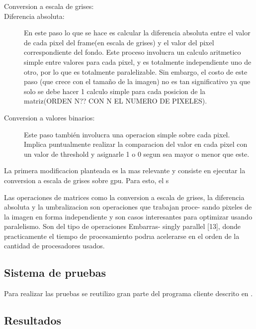 \documentclass[a4paper,10pt]{report}
\begin{document}
\begin{description}
 \item [Conversion a escala de grises: ]
 \item [Diferencia absoluta: ] En este paso lo que se hace es calcular la diferencia absoluta entre el valor de cada pixel del frame(en escala de grises) y el valor del pixel correspondiente del fondo. 
 Este proceso involucra un calculo aritmetico simple entre valores para cada pixel, y es totalmente independiente uno de otro, por lo que es totalmente paralelizable. 
 Sin embargo, el costo de este paso (que crece con el tamaño de la imagen) no es tan significativo ya que solo se debe hacer 1 calculo simple para cada posicion de la matriz(ORDEN N?? CON N EL NUMERO DE PIXELES).
 \item[Conversion a valores binarios:] Este paso también involucra una operacion simple sobre cada pixel. Implica puntualmente realizar la comparacion del valor en cada pixel con un valor de threshold y asignarle 1 o 0 segun sea mayor o menor que este.

 \end{description}
 
La primera modificacion planteada es la mas relevante y consiste en ejecutar la conversion a escala de grises sobre gpu. 
Para esto, el s 




Las operaciones de matrices como la conversion a escala de grises, la
diferencia absoluta y la umbralizacion son operaciones que trabajan proce-
sando pixeles de la imagen en forma independiente y son casos interesantes
para optimizar usando paralelismo. Son del tipo de operaciones Embarras-
singly parallel [13], donde practicamente el tiempo de procesamiento podrıa
acelerarse en el orden de la cantidad de procesadores usados. 

\subsection{Sistema de pruebas}
Para realizar las pruebas se reutilizo gran parte del programa cliente descrito en \cite[capitulo 4]{Jaureguiberry}.

\subsection{Resultados}
\end{document}
